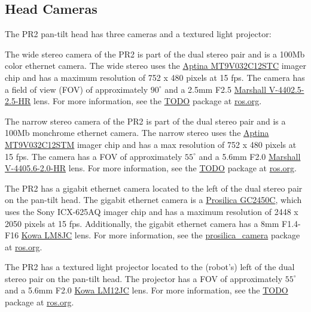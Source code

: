 \subsection{Head Cameras}
The PR2 pan-tilt head has three cameras and a textured light projector:
\begin{description}
\label{stereo camera}
\item[Wide Stereo Camera]
The wide stereo camera of the PR2 is part of the dual stereo pair and is a 100Mb color ethernet camera. The wide stereo uses the
\href{http://www.aptina.com/products/image_sensors/mt9v032c12stc/#overview}{Aptina MT9V032C12STC} imager chip
and has a maximum resolution of 752 x 480 pixels at 15 fps. The camera has a field of view (FOV) of approximately 
$90^\circ$ and a 2.5mm F2.5 \href{http://www.mars-cam.com/lenses/ccd_cmos/Technology%20Report(V-4402.5-2.5-HR).pdf}{Marshall V-4402.5-2.5-HR} 
lens. For more information, see the \href{http://www.ros.org/wiki/wge100_camera}{TODO} package
at \href{http://www.ros.org}{ros.org}.

\item[Narrow Stereo Camera]
The narrow stereo camera of the PR2 is part of the dual stereo pair and is a 100Mb monchrome ethernet camera. 
The narrow stereo uses the \href{http://www.aptina.com/products/image_sensors/mt9v032c12stm/#overview}{Aptina MT9V032C12STM} 
imager chip and has a max resolution of 752 x 480 pixels at 15 fps. The camera has a FOV of approximately $55^\circ$ and 
a 5.6mm F2.0  \href{http://www.mars-cam.com/lenses/ccd_cmos/Technology%20Report(V-4405.6-2.0-HR).pdf}{Marshall V-4405.6-2.0-HR}
lens. For more information, see the \href{http://www.ros.org/wiki/wge100_camera}{TODO} package
at \href{http://www.ros.org}{ros.org}.

\item[Gigabit Ethernet Camera]
\label{ethernet camera}
The PR2 has a gigabit ethernet camera located to the left of the dual stereo pair on the pan-tilt head. 
The gigabit ethernet camera is a \href{http://www.prosilica.com/products/gc2450.html}{Prosilica GC2450C},  
which uses the Sony ICX-625AQ imager chip and has a maximum resolution of 2448 x 2050 pixels at 15 fps. 
Additionally, the gigabit ethernet camera has a 8mm F1.4-F16 \href{http://www.kowascope.com/frontend/proddetail.asp?pn=LM8JC&co=10000348}{Kowa LM8JC} lens.
For more information, see the \href{http://www.ros.org/wiki/prosilica_camera}{prosilica\_camera} package
at \href{http://www.ros.org}{ros.org}.

\item[Textured Light Projector]
\label{texture projector}
The PR2 has a textured light projector located to the (robot's) left of the dual stereo pair on the pan-tilt head. The projector has a 
FOV of approximately $55^\circ$ and a 5.6mm F2.0 \href{http://www.kowascope.com/frontend/proddetail.asp?pn=LM12JC&co=10000348}{Kowa LM12JC} 
lens.  For more information, see the \href{http://www.ros.org/wiki/TODO}{TODO} package at \href{http://www.ros.org}{ros.org}.

\end{description}

